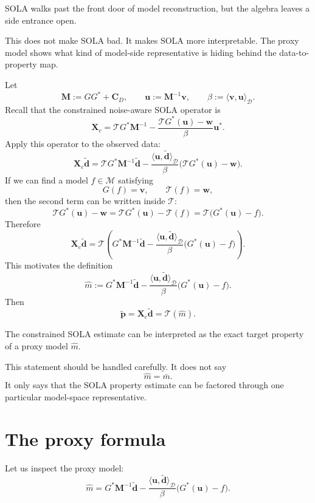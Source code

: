 \documentclass[11pt,openany]{book}
\theoremstyle{definition}
\theoremstyle{remark}
\newcommand{\M}{\mathcal M}
\newcommand{\D}{\mathcal D}
\newcommand{\Tau}{\mathcal{T}}
\begin{document}
\begin{intuitionbox}
SOLA walks past the front door of model reconstruction, but the algebra leaves a side entrance
open.
\end{intuitionbox}

This does not make SOLA bad. It makes SOLA more interpretable. The proxy model shows what
kind of model-side representative is hiding behind the data-to-property map.

Let
\[
  \mathbf M:=GG^*+\mathbf C_D,
  \qquad
  \mathbf u:=\mathbf M^{-1}\mathbf v,
  \qquad
  \beta:=\langle \mathbf v,\mathbf u\rangle_{\D}.
\]
Recall that the constrained noise-aware SOLA operator is
\[
  \mathbf X_c
  =
  \Tau G^*\mathbf M^{-1}
  -
  \frac{\Tau G^*(\mathbf u)-\mathbf w}{\beta}
  \mathbf u^*.
\]
Apply this operator to the observed data:
\[
  \mathbf X_c\widetilde{\mathbf d}
  =
  \Tau G^*\mathbf M^{-1}\widetilde{\mathbf d}
  -
  \frac{\langle \mathbf u,\widetilde{\mathbf d}\rangle_{\D}}{\beta}
  \bigl(\Tau G^*(\mathbf u)-\mathbf w\bigr).
\]
If we can find a model \(f\in\M\) satisfying
\[
  G(f)=\mathbf v,
  \qquad
  \Tau(f)=\mathbf w,
\]
then the second term can be written inside \(\Tau\):
\[
  \Tau G^*(\mathbf u)-\mathbf w
  =
  \Tau G^*(\mathbf u)-\Tau(f)
  =
  \Tau\bigl(G^*(\mathbf u)-f\bigr).
\]
Therefore
\[
  \mathbf X_c\widetilde{\mathbf d}
  =
  \Tau\left(
    G^*\mathbf M^{-1}\widetilde{\mathbf d}
    -
    \frac{\langle \mathbf u,\widetilde{\mathbf d}\rangle_{\D}}{\beta}
    \bigl(G^*(\mathbf u)-f\bigr)
  \right).
\]
This motivates the definition
\[
  \hat m
  :=
  G^*\mathbf M^{-1}\widetilde{\mathbf d}
  -
  \frac{\langle \mathbf u,\widetilde{\mathbf d}\rangle_{\D}}{\beta}
  \bigl(G^*(\mathbf u)-f\bigr).
\]
Then
\[
  \widetilde{\mathbf p}
  =
  \mathbf X_c\widetilde{\mathbf d}
  =
  \Tau(\hat m).
\]

\begin{checkpointbox}
The constrained SOLA estimate can be interpreted as the exact target property of a proxy model
\(\hat m\).
\end{checkpointbox}

This statement should be handled carefully. It does not say
\[
  \hat m=\bar m.
\]
It only says that the SOLA property estimate can be factored through one particular model-space
representative.

\section{The proxy formula}

Let us inspect the proxy model:
\[
  \hat m
  =
  G^*\mathbf M^{-1}\widetilde{\mathbf d}
  -
  \frac{\langle \mathbf u,\widetilde{\mathbf d}\rangle_{\D}}{\beta}
  \bigl(G^*(\mathbf u)-f\bigr).
\]
\end{document}
